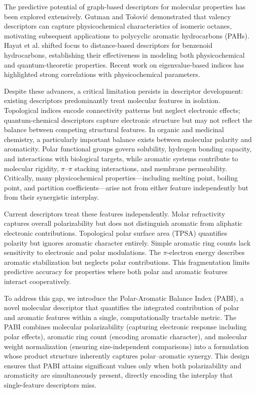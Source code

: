 \documentclass[12pt,a4paper]{article}
\begin{document}
The predictive potential of graph-based descriptors for molecular properties has been explored extensively. Gutman and To\v{s}ovi\'{c}\cite{gutman2013testing} demonstrated that valency descriptors can capture physicochemical characteristics of isomeric octanes, motivating subsequent applications to polycyclic aromatic hydrocarbons (PAHs)\cite{malik2022correlation, hayat2022valency}. Hayat et al.\cite{hayat2020quality} shifted focus to distance-based descriptors for benzenoid hydrocarbons, establishing their effectiveness in modeling both physicochemical and quantum-theoretic properties. Recent work on eigenvalue-based indices\cite{hayat2026novel, hayat2024novel} has highlighted strong correlations with physicochemical parameters.

Despite these advances, a critical limitation persists in descriptor development: existing descriptors predominantly treat molecular features in isolation. Topological indices encode connectivity patterns but neglect electronic effects; quantum-chemical descriptors capture electronic structure but may not reflect the balance between competing structural features. In organic and medicinal chemistry, a particularly important balance exists between molecular polarity and aromaticity\cite{esterhuizen2022trends}. Polar functional groups govern solubility, hydrogen bonding capacity, and interactions with biological targets, while aromatic systems contribute to molecular rigidity, $\pi$--$\pi$ stacking interactions, and membrane permeability\cite{lipinski2012rule, benet2016bddcs}. Critically, many physicochemical properties---including melting point, boiling point, and partition coefficients---arise not from either feature independently but from their synergistic interplay\cite{leach2007introduction}.

Current descriptors treat these features independently. Molar refractivity captures overall polarizability but does not distinguish aromatic from aliphatic electronic contributions\cite{miller2007molecular}. Topological polar surface area (TPSA) quantifies polarity but ignores aromatic character entirely\cite{ertl2000fast}. Simple aromatic ring counts lack sensitivity to electronic and polar modulations\cite{todeschini2009molecular}. The $\pi$-electron energy\cite{gutman2001energy} describes aromatic stabilization but neglects polar contributions. This fragmentation limits predictive accuracy for properties where both polar and aromatic features interact cooperatively.

To address this gap, we introduce the Polar-Aromatic Balance Index (PABI), a novel molecular descriptor that quantifies the integrated contribution of polar and aromatic features within a single, computationally tractable metric. The PABI combines molecular polarizability (capturing electronic response including polar effects), aromatic ring count (encoding aromatic character), and molecular weight normalization (ensuring size-independent comparisons) into a formulation whose product structure inherently captures polar--aromatic synergy. This design ensures that PABI attains significant values only when both polarizability and aromaticity are simultaneously present, directly encoding the interplay that single-feature descriptors miss.
\end{document}
